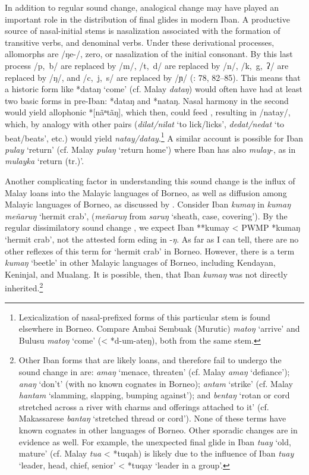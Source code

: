 \documentclass[output=paper]{langscibook}
\begin{document}
In addition to regular sound change, analogical change may have played an important role in the distribution of final glides in modern Iban. A productive source of nasal-initial stems is nasalization associated with the formation of transitive verbs, and denominal verbs. Under these derivational processes, allomorphs are \mbox{/ŋe-/}, zero, or nasalization of the initial consonant. By this last process \mbox{/p, b/} are replaced by \mbox{/m/}, \mbox{/t, d/} are replaced by \mbox{/n/}, \mbox{/k, g, ʔ/} are replaced by \mbox{/ŋ/}, and \mbox{/c, j, s/} are replaced by \mbox{/ɲ/} (\citealt{Omar1969}: 78, 82--85). This means that a historic form like *dataŋ ‘come’ (cf. Malay \textit{dataŋ}) would often have had at least two basic forms in pre-Iban: *dataŋ and *nataŋ. Nasal harmony in the second would yield allophonic *[nãⁿtãŋ], which then, could feed , resulting in \mbox{/natay/}, which, by analogy with other pairs (\textit{dilat/nilat} ‘to lick/licks’, \textit{dedat/nedat} ‘to beat/beats’, etc.) would yield \textit{natay/datay}.\footnote{Lexicalization of nasal-prefixed forms of this particular stem is found elsewhere in Borneo. Compare Ambai Sembuak (Murutic) \textit{matoŋ} ‘arrive’ and Bulusu \textit{matoŋ} ‘come’ (< *d-um-ateŋ), both from the same stem.} A similar account is possible for Iban \textit{pulay} ‘return’ (cf. Malay \textit{pulaŋ} ‘return home’) where Iban has also \textit{mulay}-, as in \textit{mulayka} ‘return (tr.)’.

Another complicating factor in understanding this sound change is the influx of Malay loans into the Malayic languages of Borneo, as well as diffusion among Malayic languages of Borneo, as discussed by \citet[193--196]{Smith2017}.  Consider Iban \textit{kumaŋ} in \textit{kumaŋ meñaruŋ} ‘hermit crab’, (\textit{meñaruŋ} from \textit{saruŋ} ‘sheath, case, covering’). By the regular dissimilatory sound change , we expect Iban **kumay < PWMP *kumaŋ ‘hermit crab’, not the attested form eding in -\textit{ŋ}. As far as I can tell, there are no other reflexes of this term for ‘hermit crab’ in Borneo. However, there is a term \textit{kumaŋ} ‘beetle’ in other Malayic languages of Borneo, including Kendayan, Keninjal, and Mualang. It is possible, then, that Iban \textit{kumaŋ} was not directly inherited.\footnote{Other Iban forms that are likely loans, and therefore fail to undergo the sound change in  are: \textit{amaŋ} ‘menace, threaten’ (cf. Malay \textit{amaŋ} ‘defiance’); \textit{anaŋ} ‘don’t’ (with no known cognates in Borneo); \textit{antam} ‘strike’ (cf. Malay \textit{hantam} ‘slamming, slapping, bumping against’); and \textit{bentaŋ} ‘rotan or cord stretched across a river with charms and offerings attached to it’ (cf. Makassarese \textit{bantaŋ} ‘stretched thread or cord’). None of these terms have known cognates in other languages of Borneo.  Other sporadic changes are in evidence as well. For example, the unexpected final glide in Iban \textit{tuay} ‘old, mature’ (cf. Malay \textit{tua} < *tuqah) is likely due to the influence of Iban \textit{tuay} ‘leader, head, chief, senior’ < *tuqay ‘leader in a group’.}
\end{document}
